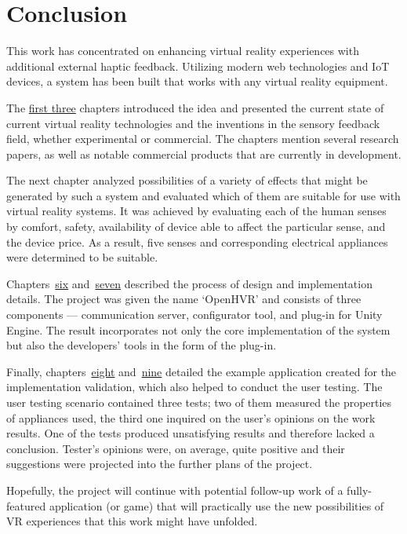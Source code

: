 \chapter{Conclusion}\label{conclusion}

This work has concentrated on enhancing virtual reality experiences with 
additional external haptic feedback. Utilizing modern web technologies and 
IoT devices, a system has been built that works with any virtual reality 
equipment.

The \hyperref[intro]{first three} chapters introduced the idea and presented the current state 
of current virtual reality technologies and the inventions in the sensory 
feedback field, whether experimental or commercial. The chapters mention 
several research papers, as well as notable commercial products that are 
currently in development.

The next chapter analyzed possibilities of a variety of effects that might 
be generated by such a system and evaluated which of them are suitable 
for use with virtual reality systems. It was achieved by evaluating each 
of the human senses by comfort, safety, availability of device able to affect 
the particular sense, and the device price. As a result, five senses 
and corresponding electrical appliances were determined to be suitable.

Chapters~\hyperref[design]{six} and~\hyperref[implementation]{seven} 
described the process of design and implementation details. 
The project was given the name `OpenHVR' and consists of three 
components — communication server, configurator tool, and plug-in for Unity 
Engine. The result incorporates not only the core implementation of 
the system but also the developers' tools in the form of the plug-in.

Finally, chapters~\hyperref[exampleapp]{eight} and~\hyperref[usertesting]{nine} 
detailed the example application created 
for the implementation validation, which also helped to conduct the user 
testing. The user testing scenario contained three tests; two of them measured 
the properties of appliances used, the third one inquired on the user's opinions
on the work results. One of the tests produced unsatisfying results 
and therefore lacked a conclusion. Tester's opinions were, on average, 
quite positive and their suggestions were projected into the 
further plans of the project.

Hopefully, the project will continue with potential follow-up work of a 
fully-featured application (or game) that will practically use the new 
possibilities of VR experiences that this work might have unfolded.